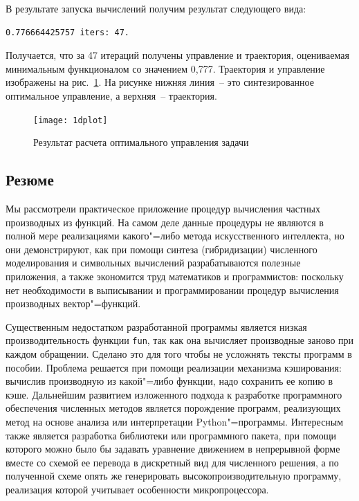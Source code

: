 \documentclass[a4paper,14pt, openany, twoside, final]{extbook} %
\begin{document}
В результате запуска вычислений получим результат следующего вида:
\begin{verbatim}
0.776664425757 iters: 47.
\end{verbatim}
Получается, что за 47 итераций получены управление и траектория, оцениваемая минимальным функционалом со значением 0,777.  Траектория и управление изображены на рис.~\ref{fig:result}. На рисунке нижняя линия~-- это синтезированное оптимальное управление, а верхняя~-- траектория.
\begin{figure}[htb]
  \centering
  \texttt{[image: 1dplot]}
  \caption{Результат расчета оптимального управления задачи}
  \label{fig:result}
\end{figure}


\subsection{Резюме}

Мы рассмотрели практическое приложение процедур вычисления частных производных из функций.  На самом деле данные процедуры не являются в полной мере реализациями какого"=либо метода искусственного интеллекта, но они демонстрируют, как при помощи синтеза (гибридизации) численного моделирования и символьных вычислений разрабатываются полезные приложения, а также экономится труд математиков и программистов: поскольку нет необходимости в выписывании и программировании процедур вычисления производных вектор"=функций.

Существенным недостатком разработанной программы является низкая производительность функции \texttt{fun}, так как она вычисляет производные заново при каждом обращении.  Сделано это для того чтобы не усложнять тексты программ в пособии.  Проблема решается при помощи реализации механизма кэширования: вычислив производную из какой"=либо функции, надо сохранить ее копию в кэше.  Дальнейшим развитием изложенного подхода к разработке программного обеспечения численных методов является порождение программ, реализующих метод на основе анализа или интерпретации Python"=программы.  Интересным также является разработка библиотеки или программного пакета, при помощи которого можно было бы задавать уравнение движением в непрерывной форме вместе со схемой ее перевода в дискретный вид для численного решения, а по полученной схеме опять же генерировать высокопроизводительную программу, реализация которой учитывает особенности микропроцессора.

\end{document}
